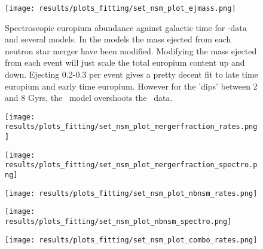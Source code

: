 \begin{figure}[h]
  \begin{minipage}[h][][t]{0.49\textwidth}
    \centering
    \texttt{[image: results/plots\_fitting/set\_nsm\_plot\_ejmass.png]}
    \caption[\todo NSM-ejectamass]{
      \label{fig:fit-v3-ejecta}
      Spectroscopic europium abundance against galactic time for \eris-data and several \omegamodel models. In the models the mass ejected from each neutron star merger have been modified.
      Modifying the mass ejected from each event will just scale the total europium content up and down.
      Ejecting 0.2-0.3 \msol per event gives a pretty decent fit to late time europium and early time europium.
      However for the 'dips' between 2 and 8 Gyrs, the \omegamodel\ model overshoots the \eris\ data.
    }
  \end{minipage}
  \begin{minipage}[h][][t]{0.49\textwidth}
    \centering
    \texttt{[image: results/plots\_fitting/set\_nsm\_plot\_mergerfraction\_rates.png]}
    \caption[\todo NSM fmerger rate]]{
      \label{fig:fit-v3-mergerfrac-nsmr}
    }
  \end{minipage}
  \begin{minipage}[h][][t]{0.49\textwidth}
    \centering
    \texttt{[image: results/plots\_fitting/set\_nsm\_plot\_mergerfraction\_spectro.png]}
    \caption[\todo mergerfraction spectroscopic plot]{
      \label{fig:fit-v3-mergerfrac-euro}
    }
  \end{minipage}
  \begin{minipage}[h][][t]{0.49\textwidth}
    \centering
    \texttt{[image: results/plots\_fitting/set\_nsm\_plot\_nbnsm\_rates.png]}
    \caption[\todo nbnsm rates plot]{
        \label{fig:fit-v3-number-nsmr}
      }
  \end{minipage}
  \begin{minipage}[h][][t]{0.49\textwidth}
    \centering
    \texttt{[image: results/plots\_fitting/set\_nsm\_plot\_nbnsm\_spectro.png]}
    \caption[\todo nbnsm spectro plot ]{
      \label{fig:fit-v3-number-euro}
    }
  \end{minipage}
  \begin{minipage}[h][][t]{0.49\textwidth}
    \centering
    \texttt{[image: results/plots\_fitting/set\_nsm\_plot\_combo\_rates.png]}
    \caption[\todo 'combo' rate plot ]{
}
\end{minipage}
\end{figure}
